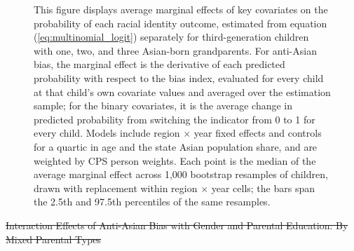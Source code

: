 \documentclass[12pt,english]{article}
\providecommand{\DIFdeltex}[1]{{\protect\color{red}\sout{#1}}}                      %
\providecommand{\DIFdelbegin}{} %
\providecommand{\DIFdelend}{} %
\providecommand{\DIFdelFL}[1]{\DIFdel{#1}} %
\providecommand{\DIFaddbeginFL}{} %
\providecommand{\DIFaddendFL}{} %
\providecommand{\DIFdelbeginFL}{} %
\providecommand{\DIFdelendFL}{} %
\providecommand{\DIFdel}[1]{\texorpdfstring{\DIFdeltex{#1}}{}} %
\newcommand{\DIFscaledelfig}{0.5}
\newlength{\DIFdelgraphicswidth} %
\newlength{\DIFdelgraphicsheight} %
\newcommand{\DIFaddincludegraphics}[2][]{{\color{blue}\fbox{\DIFOincludegraphics[#1]{#2}}}} %
\newcommand{\DIFdelincludegraphics}[2][]{%
\sbox{\DIFdelgraphicsbox}{\DIFOincludegraphics[#1]{#2}}%
\settoboxwidth{\DIFdelgraphicswidth}{\DIFdelgraphicsbox} %
\settoboxtotalheight{\DIFdelgraphicsheight}{\DIFdelgraphicsbox} %
\scalebox{\DIFscaledelfig}{%
\parbox[b]{\DIFdelgraphicswidth}{\usebox{\DIFdelgraphicsbox}\\[-\baselineskip] \rule{\DIFdelgraphicswidth}{0em}}\llap{\resizebox{\DIFdelgraphicswidth}{\DIFdelgraphicsheight}{%
\setlength{\unitlength}{\DIFdelgraphicswidth}%
\begin{picture}(1,1)%
\thicklines\linethickness{2pt} %
{\color[rgb]{1,0,0}\put(0,0){\framebox(1,1){}}}%
{\color[rgb]{1,0,0}\put(0,0){\line( 1,1){1}}}%
{\color[rgb]{1,0,0}\put(0,1){\line(1,-1){1}}}%
\end{picture}%
}\hspace*{3pt}}} %
} %
\DeclareRobustCommand{\DIFdelbegin}{\DIFOdelbegin \let\includegraphics\DIFdelincludegraphics} %
\DeclareRobustCommand{\DIFdelend}{\DIFOaddend \let\includegraphics\DIFOincludegraphics} %
\DeclareRobustCommand{\DIFaddbeginFL}{\DIFOaddbeginFL \let\includegraphics\DIFaddincludegraphics} %
\DeclareRobustCommand{\DIFaddendFL}{\DIFOaddendFL \let\includegraphics\DIFOincludegraphics} %
\DeclareRobustCommand{\DIFdelbeginFL}{\DIFOdelbeginFL \let\includegraphics\DIFdelincludegraphics} %
\DeclareRobustCommand{\DIFdelendFL}{\DIFOaddendFL \let\includegraphics\DIFOincludegraphics} %
\begin{document}
\begin{center}
\begin{figure}[!htb]
\DIFdelbeginFL %
\DIFdelendFL \DIFaddbeginFL \caption*{\footnotesize{This figure displays average marginal effects of key covariates on the probability of each racial identity outcome, estimated from equation (\ref{eq:multinomial_logit}) separately for third-generation children with one, two, and three Asian-born grandparents. For anti-Asian bias, the marginal effect is the derivative of each predicted probability with respect to the bias index, evaluated for every child at that child's own covariate values and averaged over the estimation sample; for the binary covariates, it is the average change in predicted probability from switching the indicator from 0 to 1 for every child. Models include region $\times$ year fixed effects and controls for a quartic in age and the state Asian population share, and are weighted by CPS person weights. Each point is the median of the average marginal effect across 1{,}000 bootstrap resamples of children, drawn with replacement within region $\times$ year cells; the bars span the 2.5th and 97.5th percentiles of the same resamples.}}
\DIFaddendFL \end{figure}
\end{center}

\pagebreak
\newpage
\DIFdelbegin %

\DIFdelend %
\DIFdelbegin %
{%
\DIFdelFL{Interaction Effects of Anti-Asian Bias with Gender and Parental Education: By Mixed Parental Types}}
\DIFdelFL{\label{fig:interaction-coefs-aw-wa-awwa}
}%
\end{document}
